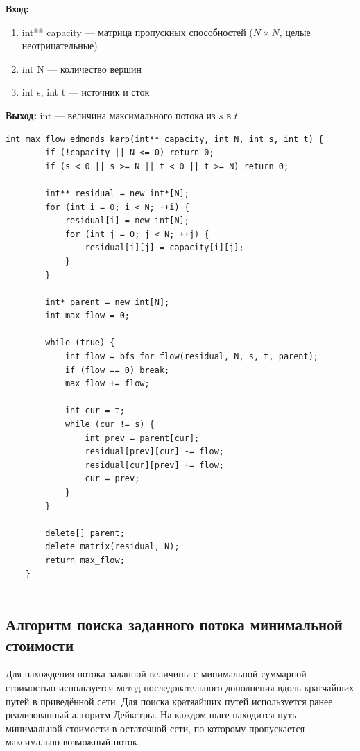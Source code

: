 \noindent\textbf{Вход:}
\begin{enumerate}
	\item int** capacity — матрица пропускных способностей ($N \times N$, целые неотрицательные)
	\item int N — количество вершин
	\item int s, int t — источник и сток
\end{enumerate}
\noindent\textbf{Выход:}
int — величина максимального потока из $s$ в $t$

\begin{lstlisting}[caption=Максимальный поток (flows.cpp)]
	int max_flow_edmonds_karp(int** capacity, int N, int s, int t) {
		if (!capacity || N <= 0) return 0;
		if (s < 0 || s >= N || t < 0 || t >= N) return 0;
		
		int** residual = new int*[N];
		for (int i = 0; i < N; ++i) {
			residual[i] = new int[N];
			for (int j = 0; j < N; ++j) {
				residual[i][j] = capacity[i][j];
			}
		}
		
		int* parent = new int[N];
		int max_flow = 0;
		
		while (true) {
			int flow = bfs_for_flow(residual, N, s, t, parent);
			if (flow == 0) break;
			max_flow += flow;
			
			int cur = t;
			while (cur != s) {
				int prev = parent[cur];
				residual[prev][cur] -= flow;
				residual[cur][prev] += flow;
				cur = prev;
			}
		}
		
		delete[] parent;
		delete_matrix(residual, N);
		return max_flow;
	}
	
\end{lstlisting}

\subsection{Алгоритм поиска заданного потока минимальной стоимости}
Для нахождения потока заданной величины с минимальной суммарной стоимостью используется метод последовательного дополнения вдоль кратчайших путей в приведённой сети. Для поиска кратяайших путей используется ранее реализованный алгоритм Дейкстры. На каждом шаге находится путь минимальной стоимости в остаточной сети, по которому пропускается максимально возможный поток.

